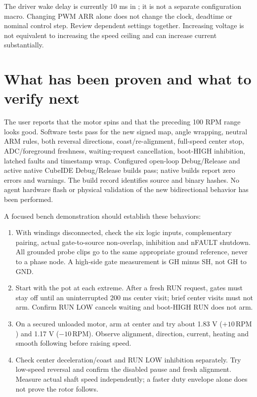 \documentclass[11pt,letterpaper]{article}
\newcommand{\code}[1]{\texttt{\detokenize{#1}}}
\newcommand{\rpm}{\mathrm{RPM}}
\begin{document}
The driver wake delay is currently 10 ms in \code{open_loop.c}; it is not a
separate configuration macro. Changing PWM ARR alone does not change the
clock, deadtime or nominal control step. Review dependent settings together.
Increasing voltage is not equivalent to increasing the speed ceiling and can
increase current substantially.

\section{What has been proven and what to verify next}

The user reports that the motor spins and that the preceding 100 RPM range
looks good. Software tests pass for the new signed map, angle wrapping,
neutral ARM rules, both reversal directions, coast/re-alignment, full-speed
center stop, ADC/foreground freshness, waiting-request cancellation,
boot-HIGH inhibition, latched faults and timestamp wrap.
Configured open-loop Debug/Release and active native CubeIDE Debug/Release
builds pass; native builds report zero errors and warnings. The build record
identifies source and binary hashes. No agent hardware flash or physical
validation of the new bidirectional behavior has been performed.\cite{evidence}

A focused bench demonstration should establish these behaviors:
\begin{enumerate}
\item With windings disconnected, check the six logic inputs, complementary
pairing, actual gate-to-source non-overlap, inhibition and nFAULT shutdown.
All grounded probe clips go to the same appropriate ground reference, never
to a phase node. A high-side gate measurement is GH minus SH, not GH to GND.
\item Start with the pot at each extreme. After a fresh RUN request, gates
must stay off until an uninterrupted 200 ms center visit; brief center visits
must not arm. Confirm RUN LOW cancels waiting and boot-HIGH RUN does not arm.
\item On a secured unloaded motor, arm at center and try about 1.83 V
($+10\,\rpm$) and 1.17 V ($-10\,\rpm$). Observe alignment, direction, current,
heating and smooth following before raising speed.
\item Check center deceleration/coast and RUN LOW inhibition separately.
Try low-speed reversal and confirm the disabled pause and fresh alignment.
Measure actual shaft speed independently; a faster duty envelope alone does
not prove the rotor follows.
\end{enumerate}
\end{document}
